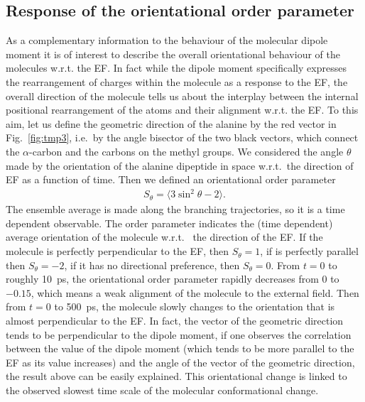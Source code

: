 \documentclass[a4paper,preprint,unsortedaddress,onecolumn]{revtex4-1}
\begin{document}
\subsection{Response of the orientational order parameter}
As a complementary information to the behaviour of the molecular dipole moment it is of interest to describe the overall orientational behaviour of the molecules w.r.t. the EF. In fact while the dipole moment specifically expresses the rearrangement of charges within the molecule as a response to the EF, the overall direction of the molecule tells us about the interplay between the internal positional rearrangement of the atoms and their alignment w.r.t. the EF.   
To this aim, let us define
the geometric direction of the alanine by the red vector in
Fig.~\ref{fig:tmp3}, i.e.~by the angle bisector of the two black vectors,
which connect the $\alpha$-carbon and the carbons
on the methyl groups. 
We considered the angle $\theta$ made by 
the orientation of the alanine dipeptide in space w.r.t.~the direction of EF
as a function of time.
Then we defined an orientational order parameter 
\begin{align}
  S_\theta = \langle 3\sin^2\theta - 2\rangle.
\end{align}
The ensemble average is made along the branching trajectories, so it is
a time dependent observable.
The order parameter
indicates the (time dependent) average orientation of the molecule w.r.t. ~the direction of the EF.
If the molecule is perfectly perpendicular to the EF, then $S_\theta = 1$, if is perfectly parallel then $S_\theta = -2$, if it has no directional
preference, then $S_\theta = 0$. 
From $t=0$ to roughly 10~ps, the orientational order parameter rapidly
decreases from 0 to $-0.15$, which means a weak alignment of the molecule to the external field.
Then from $t=0$ to 500~ps, the molecule slowly changes to the orientation
that is almost perpendicular to the EF.
In fact,
  the vector of the geometric direction tends to be perpendicular
    to the dipole moment,
  if one observes the correlation between the value
  of the dipole moment (which tends to be more parallel to the EF as
  its value increases) and the angle of the vector of the geometric
  direction, the result above can be easily explained.
This orientational change is linked to the observed slowest
time scale of the molecular conformational change.
 
\end{document}
